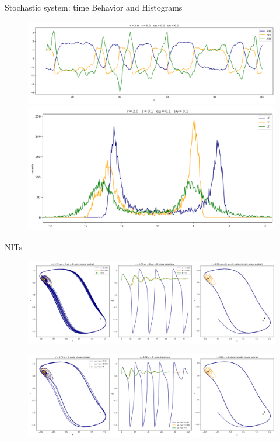 \documentclass[10pt]{beamer}
\begin{document}
\begin{frame}{Stochastic system: time Behavior and Histograms}
	\begin{figure}
		\includegraphics[width=\textwidth, height=0.52\textheight,keepaspectratio]{figures_2/r-2-eps0.1-omega0.1-time-trajectories.png}
		\includegraphics[width=\textwidth, height=0.52\textheight,keepaspectratio]{figures_2/r-2-eps0.1-omega0.1-hist.png}
	\end{figure}
\end{frame}

\begin{frame}{NITs}
	\begin{figure}
		\includegraphics[width=\textwidth, height=\textheight,keepaspectratio]{figures_2/NIT-r1.72-vs-eps-adv.png}
	\end{figure}

	\begin{figure}
		\includegraphics[width=\textwidth, height=\textheight,keepaspectratio]{figures_2/NIT-r1.72-vs-omega-adv.png}
	\end{figure}
\end{frame}
\end{document}
